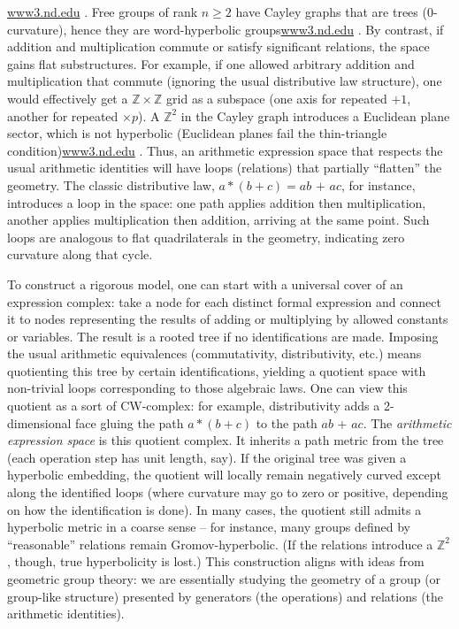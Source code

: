 \documentclass[11pt]{article}
\theoremstyle{remark}
\begin{document}
\href{https://www3.nd.edu/~gszekely/rtg/GTS/www3.nd.edu/_jquigle2/GSTS%20FA18/Week3.pdf#:~:text=Definition%204,2}{www3.nd.edu}
. Free groups of rank $n\ge 2$ have Cayley graphs that are trees (0-curvature), hence they are word-hyperbolic groups\href{https://www3.nd.edu/~gszekely/rtg/GTS/www3.nd.edu/_jquigle2/GSTS%20FA18/Week3.pdf#:~:text=Definition%204,2}{www3.nd.edu}
. By contrast, if addition and multiplication commute or satisfy significant relations, the space gains flat substructures. For example, if one allowed arbitrary addition and multiplication that commute (ignoring the usual distributive law structure), one would effectively get a $\mathbb{Z}\times \mathbb{Z}$ grid as a subspace (one axis for repeated $+1$, another for repeated $\times p$). A $\mathbb{Z}^2$ in the Cayley graph introduces a Euclidean plane sector, which is not hyperbolic (Euclidean planes fail the thin-triangle condition)\href{https://www3.nd.edu/~gszekely/rtg/GTS/www3.nd.edu/_jquigle2/GSTS%20FA18/Week3.pdf#:~:text=%28b%29%20Finite%20groups%20are%20hyperbolic,Z%202%20is%20not%20hyperbolic}{www3.nd.edu}
. Thus, an arithmetic expression space that respects the usual arithmetic identities will have loops (relations) that partially “flatten” the geometry. The classic distributive law, $a*(b+c) = a\textit{b + a}c$, for instance, introduces a loop in the space: one path applies addition then multiplication, another applies multiplication then addition, arriving at the same point. Such loops are analogous to flat quadrilaterals in the geometry, indicating zero curvature along that cycle.

To construct a rigorous model, one can start with a universal cover of an expression complex: take a node for each distinct formal expression and connect it to nodes representing the results of adding or multiplying by allowed constants or variables. The result is a rooted tree if no identifications are made. Imposing the usual arithmetic equivalences (commutativity, distributivity, etc.) means quotienting this tree by certain identifications, yielding a quotient space with non-trivial loops corresponding to those algebraic laws. One can view this quotient as a sort of CW-complex: for example, distributivity adds a 2-dimensional face gluing the path $a*(b+c)$ to the path $a\textit{b + a}c$. The \textit{arithmetic expression space} is this quotient complex. It inherits a path metric from the tree (each operation step has unit length, say). If the original tree was given a hyperbolic embedding, the quotient will locally remain negatively curved except along the identified loops (where curvature may go to zero or positive, depending on how the identification is done). In many cases, the quotient still admits a hyperbolic metric in a coarse sense – for instance, many groups defined by “reasonable” relations remain Gromov-hyperbolic. (If the relations introduce a $\mathbb{Z}^2$, though, true hyperbolicity is lost.) This construction aligns with ideas from geometric group theory: we are essentially studying the geometry of a group (or group-like structure) presented by generators (the operations) and relations (the arithmetic identities).
\end{document}
